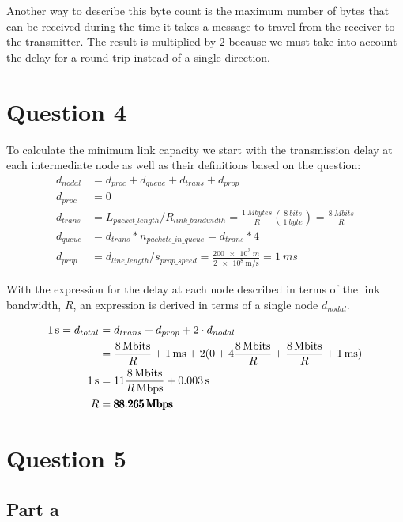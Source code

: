 \documentclass[12pt,letterpaper]{article}
\begin{document}
Another way to describe this byte count is the maximum number of bytes that
can be received during the time it takes a message to travel from the receiver
to the transmitter. The result is multiplied by $2$ because we must take into account
the delay for a round-trip instead of a single direction.

\section*{Question 4}

To calculate the minimum link capacity we start with the transmission delay
at each intermediate node as well as their definitions based on the question:
\begin{align*}
d_{nodal} &= d_{proc} + d_{queue} + d_{trans} + d_{prop} \\
d_{proc} &= 0 \\
d_{trans} &= L_{packet\_length} / R_{link\_bandwidth} = \frac{\SI{1}{Mbytes}}{R}(\frac{\SI{8}{bits}}{\SI{1}{byte}}) = \frac{\SI{8}{Mbits}}{R} \\
d_{queue} &= d_{trans} * n_{packets\_in\_queue} = d_{trans} * 4 \\
d_{prop} &= d_{line\_length} / s_{prop\_speed} = \frac{\SI{200e3}{m}}{\SI{2e8}{\m/\s}} = \SI{1}{ms}
\end{align*}

With the expression for the delay at each node described in terms of the link bandwidth,
$R$, an expression is derived in terms of a single node $d_{nodal}$.

\begin{align*}
\SI{1}{s} = d_{total} &= d_{trans} + d_{prop} + 2 \cdot d_{nodal} \\
&= \frac{\SI{8}{Mbits}}{R} + \SI{1}{ms} + 2(0 + 4\frac{\SI{8}{Mbits}}{R} + \frac{\SI{8}{Mbits}}{R} + \SI{1}{ms}) \\
\SI{1}{s} &= 11\frac{\SI{8}{Mbits}}{\SI[parse-numbers = false]{R}{Mbps}} + \SI{0.003}{s} \\
R &= \pmb{\SI{88.265}{Mbps}} 
\end{align*}

\section*{Question 5}
\subsection*{Part a}
\end{document}
